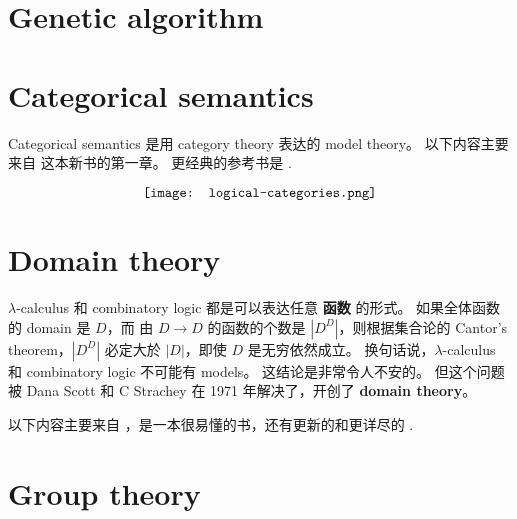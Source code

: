 \documentclass[12pt, orivec]{article}
\begin{document}
\section{Genetic algorithm}



\section{Categorical semantics}

Categorical semantics 是用 category theory 表达的 model theory。  以下内容主要来自 \parencite{Caramello2018} 这本新书的第一章。  更经典的参考书是 \parencite{Goldblatt2006}. 



\begin{equation}
\vcenter{\hbox{\texttt{[image: logical-categories.png]}}}
\end{equation}

\section{Domain theory}

$\lambda$-calculus 和 combinatory logic 都是可以表达任意 \textbf{函数} 的形式。 如果全体函数的 domain 是 $D$，而 由 $D \rightarrow D$ 的函数的个数是 $|D^D|$，则根据集合论的 Cantor's theorem，$|D^D|$ 必定大於 $|D|$，即使 $D$ 是无穷依然成立。 换句话说，$\lambda$-calculus 和 combinatory logic 不可能有 models。  这结论是非常令人不安的。 但这个问题被 Dana Scott 和 C Strachey 在 1971 年解决了，开创了 \textbf{domain theory}。

以下内容主要来自 \parencite{Vickers1989}，是一本很易懂的书，还有更新的和更详尽的 \parencite{Goubault-Larrecq2013}.


\section{Group theory}

\printbibliography
\end{document}
